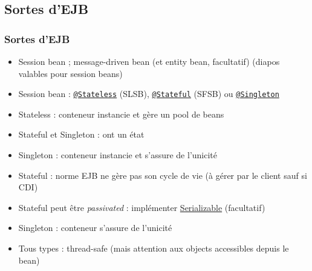 \documentclass[english, french]{beamer}
\begin{document}
\subsection{Sortes d’EJB}
\begin{frame}
	\frametitle{Sortes d’EJB}
	\begin{itemize}
		\item Session bean ; message-driven bean {\tiny (et entity bean, facultatif)} {\tiny (diapos valables pour session beans)}
		\item Session bean : \href{https://docs.oracle.com/javaee/7/api/javax/ejb/Stateless.html}{\texttt{@Stateless}} (SLSB), \href{https://docs.oracle.com/javaee/7/api/javax/ejb/Stateful.html}{\texttt{@Stateful}} (SFSB) ou \href{https://docs.oracle.com/javaee/7/api/javax/ejb/Singleton.html}{\texttt{@Singleton}}
		\item Stateless : conteneur instancie et gère un pool de beans
		\item Stateful et Singleton : ont un état
		\item Singleton : conteneur instancie et s’assure de l’unicité
		\item Stateful : norme EJB ne gère pas son cycle de vie (à gérer par le client {\tiny sauf si CDI})
		\item Stateful peut être \emph{passivated} : implémenter \href{https://docs.oracle.com/javase/8/docs/api/java/io/Serializable.html}{Serializable} {\tiny (facultatif)}
		\item Singleton : conteneur s’assure de l’unicité
		\item Tous types : thread-safe {\tiny (mais attention aux objects accessibles depuis le bean)}
	\end{itemize}
\end{frame}
\end{document}
